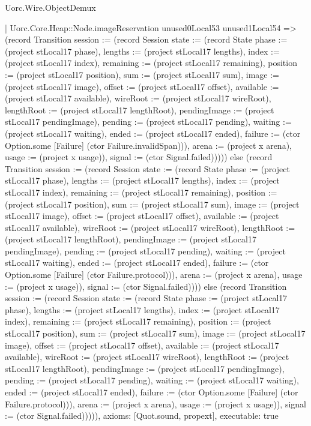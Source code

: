 \begin{lexlean}{Uorc.Wire.ObjectDemux}
\begin{semanticmodule}
{        | Uorc.Core.Heap::Node.imageReservation unused0Local53 unused1Local54 => (record Transition {session := (record Session {state := (record State {phase := (project stLocal17 phase), lengths := (project stLocal17 lengths), index := (project stLocal17 index), remaining := (project stLocal17 remaining), position := (project stLocal17 position), sum := (project stLocal17 sum), image := (project stLocal17 image), offset := (project stLocal17 offset), available := (project stLocal17 available), wireRoot := (project stLocal17 wireRoot), lengthRoot := (project stLocal17 lengthRoot), pendingImage := (project stLocal17 pendingImage), pending := (project stLocal17 pending), waiting := (project stLocal17 waiting), ended := (project stLocal17 ended), failure := (ctor Option.some [Failure] (ctor Failure.invalidSpan))}), arena := (project x arena), usage := (project x usage)}), signal := (ctor Signal.failed)})))) else (record Transition {session := (record Session {state := (record State {phase := (project stLocal17 phase), lengths := (project stLocal17 lengths), index := (project stLocal17 index), remaining := (project stLocal17 remaining), position := (project stLocal17 position), sum := (project stLocal17 sum), image := (project stLocal17 image), offset := (project stLocal17 offset), available := (project stLocal17 available), wireRoot := (project stLocal17 wireRoot), lengthRoot := (project stLocal17 lengthRoot), pendingImage := (project stLocal17 pendingImage), pending := (project stLocal17 pending), waiting := (project stLocal17 waiting), ended := (project stLocal17 ended), failure := (ctor Option.some [Failure] (ctor Failure.protocol))}), arena := (project x arena), usage := (project x usage)}), signal := (ctor Signal.failed)}))) else (record Transition {session := (record Session {state := (record State {phase := (project stLocal17 phase), lengths := (project stLocal17 lengths), index := (project stLocal17 index), remaining := (project stLocal17 remaining), position := (project stLocal17 position), sum := (project stLocal17 sum), image := (project stLocal17 image), offset := (project stLocal17 offset), available := (project stLocal17 available), wireRoot := (project stLocal17 wireRoot), lengthRoot := (project stLocal17 lengthRoot), pendingImage := (project stLocal17 pendingImage), pending := (project stLocal17 pending), waiting := (project stLocal17 waiting), ended := (project stLocal17 ended), failure := (ctor Option.some [Failure] (ctor Failure.protocol))}), arena := (project x arena), usage := (project x usage)}), signal := (ctor Signal.failed)})))),
  axioms: [Quot.sound, propext],
  executable: true
}


\end{semanticmodule}
\end{lexlean}
